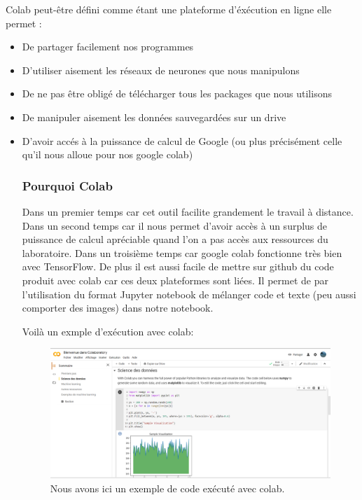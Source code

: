 Colab peut-être défini comme étant une plateforme d'éxécution en ligne elle permet :
\begin{itemize}
\item De partager facilement nos programmes
\item D'utiliser aisement les réseaux de neurones que nous manipulons
\item De ne pas être obligé de télécharger tous les packages que nous utilisons
\item De manipuler aisement les données sauvegardées sur un drive
\item D'avoir accés à la puissance de calcul de Google (ou plus précisément celle qu'il nous alloue pour nos google colab)

\hypertarget{Pourquoi-Colab}{%
\subsubsection{Pourquoi Colab}
\label{Pourquoi-Colab}}
Dans un premier temps car cet outil facilite grandement le travail à distance.
Dans un second temps car il nous permet d'avoir accès à un surplus de puissance de calcul apréciable quand l'on a pas accès aux ressources du laboratoire.
Dans un troisième temps car google colab fonctionne très bien avec TensorFlow.
De plus il est aussi facile de mettre sur github du code produit avec colab car ces deux plateformes sont liées. Il permet de par l'utilisation du format Jupyter notebook de mélanger code et texte (peu aussi comporter des images) dans notre notebook.

Voilà un exmple d'exécution avec colab:

\begin{figure}[h]
\begin{center}
\includegraphics[width=15cm]{./images/Cap_colab.PNG}
\caption{Nous avons ici un exemple de code exécuté avec colab.}
\end{center}
\end{figure}


\end{itemize}
